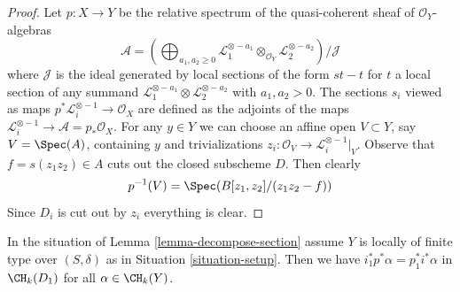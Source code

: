 \begin{proof}
Let $p : X \to Y$ be the relative spectrum of the quasi-coherent
sheaf of $\mathcal{O}_Y$-algebras
$$
\mathcal{A} =
\left(\bigoplus\nolimits_{a_1, a_2 \geq 0}
\mathcal{L}_1^{\otimes -a_1} \otimes_{\mathcal{O}_Y}
\mathcal{L}_2^{\otimes -a_2}\right)/\mathcal{J}
$$
where $\mathcal{J}$ is the ideal generated by local sections of
the form $st - t$ for $t$ a local section of any summand
$\mathcal{L}_1^{\otimes -a_1} \otimes \mathcal{L}_2^{\otimes -a_2}$
with $a_1, a_2 > 0$. The sections $s_i$ viewed as maps
$p^*\mathcal{L}_i^{\otimes -1} \to \mathcal{O}_X$ are defined as the adjoints
of the maps $\mathcal{L}_i^{\otimes -1} \to \mathcal{A} = p_*\mathcal{O}_X$.
For any $y \in Y$ we can choose an affine
open $V \subset Y$, say $V = \Spec(A)$, containing $y$ and
trivializations $z_i : \mathcal{O}_V \to \mathcal{L}_i^{\otimes -1}|_V$.
Observe that $f = s(z_1z_2) \in A$ cuts out the closed subscheme $D$.
Then clearly
$$
p^{-1}(V) = \Spec(B[z_1, z_2]/(z_1 z_2 - f))
$$
Since $D_i$ is cut out by $z_i$ everything is clear.
\end{proof}

\begin{lemma}
\label{lemma-decompose-section-formulae}
In the situation of Lemma \ref{lemma-decompose-section}
assume $Y$ is locally of finite type over $(S, \delta)$ as in
Situation \ref{situation-setup}. Then we have
$i_1^*p^*\alpha = p_1^*i^*\alpha$
in $\CH_k(D_1)$ for all $\alpha \in \CH_k(Y)$.
\end{lemma}

